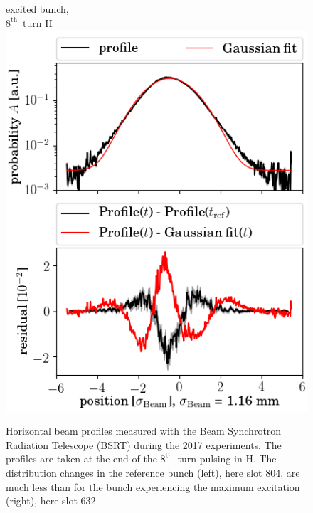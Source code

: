 \documentclass[%
 reprint,
 amsmath,amssymb,
 aps,
prstab,
]{revtex4-1}
\begin{document}
\begin{figure}[h]
\begin{minipage}[t]{0.49\linewidth}
		excited bunch,\\ $8^{\mathrm{th}}$~turn H	\includegraphics[width=1.0\linewidth]{profile_h_8thh_slot_632.png}
	\end{minipage}
	\caption{\label{fig:8thexpprof} Horizontal beam profiles measured with the Beam Synchrotron Radiation Telescope (BSRT) during the 2017 experiments. The profiles are taken at the end of the $8^{\mathrm{th}}$~turn pulsing in H. The distribution changes in the reference bunch (left), here slot 804, are much less than for the bunch experiencing the maximum excitation (right), here slot 632.}
\end{figure}
 
\end{document}
